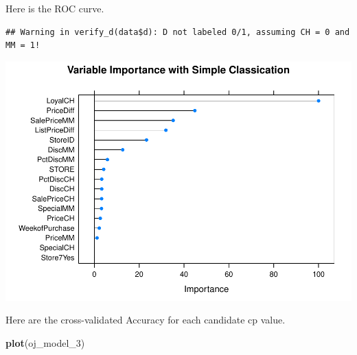 \documentclass[
]{book}
\newenvironment{Shaded}{\begin{snugshade}}{\end{snugshade}}
\newcommand{\DataTypeTok}[1]{\textcolor[rgb]{0.13,0.29,0.53}{#1}}
\newcommand{\DecValTok}[1]{\textcolor[rgb]{0.00,0.00,0.81}{#1}}
\newcommand{\FloatTok}[1]{\textcolor[rgb]{0.00,0.00,0.81}{#1}}
\newcommand{\KeywordTok}[1]{\textcolor[rgb]{0.13,0.29,0.53}{\textbf{#1}}}
\newcommand{\NormalTok}[1]{#1}
\newcommand{\OperatorTok}[1]{\textcolor[rgb]{0.81,0.36,0.00}{\textbf{#1}}}
\newcommand{\StringTok}[1]{\textcolor[rgb]{0.31,0.60,0.02}{#1}}
\begin{document}
Here is the ROC curve.

\begin{Shaded}
\end{Shaded}

\begin{verbatim}
## Warning in verify_d(data$d): D not labeled 0/1, assuming CH = 0 and MM = 1!
\end{verbatim}

\includegraphics{data-sci_files/figure-latex/unnamed-chunk-55-1.pdf}

Here are the cross-validated Accuracy for each candidate cp value.

\begin{Shaded}
\begin{Highlighting}[]
\KeywordTok{plot}\NormalTok{(oj_model_}\DecValTok{3}\NormalTok{)}
\end{Highlighting}
\end{Shaded}
\end{document}
